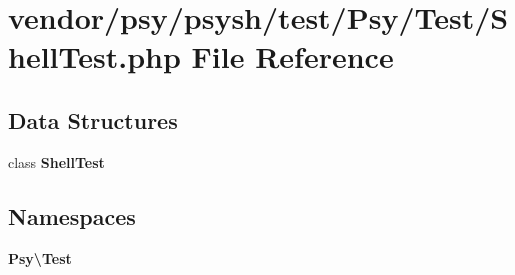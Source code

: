 \section{vendor/psy/psysh/test/\+Psy/\+Test/\+Shell\+Test.php File Reference}
\label{_shell_test_8php}
\subsection*{Data Structures}
\begin{DoxyCompactItemize}
\item 
class {\bf Shell\+Test}
\end{DoxyCompactItemize}
\subsection*{Namespaces}
\begin{DoxyCompactItemize}
\item 
 {\bf Psy\textbackslash{}\+Test}
\end{DoxyCompactItemize}
